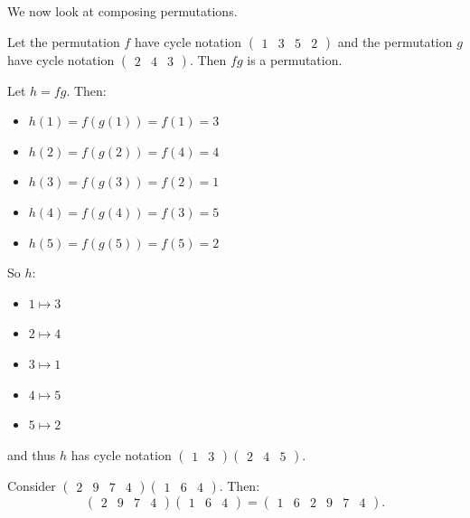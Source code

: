 We now look at composing permutations.
\begin{example}
    Let the permutation $f$ have cycle notation $\begin{pmatrix}1 & 3 & 5 & 2\end{pmatrix}$ and the permutation $g$ have cycle notation $\begin{pmatrix}2 & 4 & 3\end{pmatrix}$. Then $fg$ is a permutation.

    Let $h = fg$. Then:
    \begin{itemize}
        \item $h(1) = f(g(1)) = f(1) = 3$
        \item $h(2) = f(g(2)) = f(4) = 4$
        \item $h(3) = f(g(3)) = f(2) = 1$
        \item $h(4) = f(g(4)) = f(3) = 5$
        \item $h(5) = f(g(5)) = f(5) = 2$
    \end{itemize}

    

    So $h$:
    \begin{itemize}
        \item $1 \mapsto 3$
        \item $2 \mapsto 4$
        \item $3 \mapsto 1$
        \item $4 \mapsto 5$
        \item $5 \mapsto 2$
    \end{itemize}
    and thus $h$ has cycle notation $\begin{pmatrix}1 & 3\end{pmatrix}\begin{pmatrix}2 & 4 & 5\end{pmatrix}$.
\end{example}

\begin{example}
    Consider $\begin{pmatrix}2 & 9 & 7 & 4\end{pmatrix}\begin{pmatrix}1 & 6 & 4\end{pmatrix}$. Then:
    \[\begin{pmatrix}2 & 9 & 7 & 4\end{pmatrix}\begin{pmatrix}1 & 6 & 4\end{pmatrix} = \begin{pmatrix}1 & 6 & 2 & 9 & 7 & 4\end{pmatrix}.\]
\end{example}

